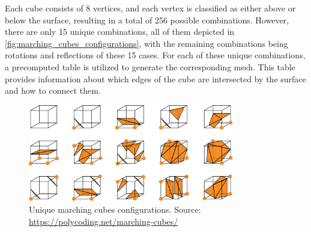 Each cube consists of 8 vertices, and each vertex is classified as either above or below the surface, resulting in a total of 256 possible combinations.
However, there are only 15 unique combinations, all of them depicted in \autoref{fig:marching_cubes_configurations}, with the remaining combinations being rotations and reflections of these 15 cases.
For each of these unique combinations, a precomputed table is utilized to generate the corresponding mesh.
This table provides information about which edges of the cube are intersected by the surface and how to connect them.

\begin{figure}[H]
    \centering
    \includegraphics[width=0.8\textwidth]{chapters/theoretical_foundations/sections/marching_cubes/resources/marching-cubes-configurations.png}
    \caption[Unique marching cubes configurations]{Unique marching cubes configurations. Source: \url{https://polycoding.net/marching-cubes/}}
    \label{fig:marching_cubes_configurations}
\end{figure}
